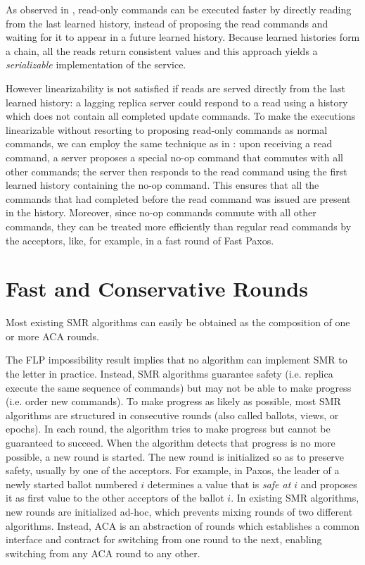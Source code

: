 As observed in \cite{FalerioETAL12GeneralizedLatticeAgreement}, read-only
commands can be executed faster by directly reading from the last learned
history, instead of proposing the read commands and waiting for it to appear in
a future learned history.  Because learned histories form a chain, all the reads
return consistent values and this approach yields a \emph{serializable}
implementation of the service.

However linearizability is not satisfied if reads are served directly
from the last learned history: a lagging replica server could respond
to a read using a history which does not contain all completed update
commands. To make the executions linearizable without resorting to
proposing read-only commands as normal commands, we can employ the same
technique as in \cite{FalerioETAL12GeneralizedLatticeAgreement}: upon
receiving a read command, a server proposes a special no-op command
that commutes with all other commands; the server then responds to the
read command using the first learned history containing the no-op
command. This ensures that all the commands that had completed before
the read command was issued are present in the history.  Moreover,
since no-op commands commute with all other commands, they can be
treated more efficiently than regular read commands by the acceptors,
like, for example, in a fast round of Fast Paxos.

\section{Fast and Conservative Rounds}
\label{sec:rounds}

Most existing SMR algorithms can easily be obtained as the
composition of one or more ACA rounds. 

The FLP impossibility result \cite{FischerLynchPaterson83ImpossibilityDistributedConsensusOneFaultyProcess}
implies that no algorithm can implement SMR to the letter in practice.
Instead, SMR algorithms guarantee safety (i.e. replica execute the
same sequence of commands) but may not be able to make progress (i.e.
order new commands). To make progress as likely as possible, most SMR
algorithms are structured in consecutive rounds (also called ballots,
views, or epochs). In each round, the algorithm tries to make progress
but cannot be guaranteed to succeed. When the algorithm detects that
progress is no more possible, a new round is started.  The new round
is initialized so as to preserve safety, usually by one of the
acceptors. For example, in Paxos, the leader of a newly started ballot
numbered $i$ determines a value that is \emph{safe at $i$} and
proposes it as first value to the other acceptors of the ballot $i$.
In existing SMR algorithms, new rounds are initialized ad-hoc, which
prevents mixing rounds of two different algorithms.  Instead,
ACA is an abstraction of rounds which establishes a common interface and contract for switching from
one round to the next, enabling switching from any ACA round to any other.

